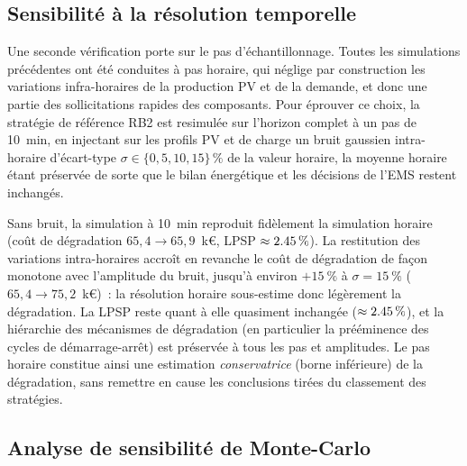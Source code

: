 \subsection{Sensibilité à la résolution temporelle}

Une seconde vérification porte sur le pas d'échantillonnage. Toutes les simulations précédentes ont été conduites à pas horaire, qui néglige par construction les variations infra-horaires de la production PV et de la demande, et donc une partie des sollicitations rapides des composants. Pour éprouver ce choix, la stratégie de référence RB2 est resimulée sur l'horizon complet à un pas de \SI{10}{\minute}, en injectant sur les profils PV et de charge un bruit gaussien intra-horaire d'écart-type $\sigma \in \{0,5,10,15\}\,\%$ de la valeur horaire, la moyenne horaire étant préservée de sorte que le bilan énergétique et les décisions de l'EMS restent inchangés.

Sans bruit, la simulation à \SI{10}{\minute} reproduit fidèlement la simulation horaire (coût de dégradation $65{,}4 \rightarrow 65{,}9$~k€, LPSP $\approx \SI{2{,}45}{\percent}$). La restitution des variations intra-horaires accroît en revanche le coût de dégradation de façon monotone avec l'amplitude du bruit, jusqu'à environ $+\SI{15}{\percent}$ à $\sigma = \SI{15}{\percent}$ ($65{,}4 \rightarrow 75{,}2$~k€)~: la résolution horaire sous-estime donc légèrement la dégradation. La LPSP reste quant à elle quasiment inchangée ($\approx \SI{2{,}45}{\percent}$), et la hiérarchie des mécanismes de dégradation (en particulier la prééminence des cycles de démarrage-arrêt) est préservée à tous les pas et amplitudes. Le pas horaire constitue ainsi une estimation \emph{conservatrice} (borne inférieure) de la dégradation, sans remettre en cause les conclusions tirées du classement des stratégies.

\subsection{Analyse de sensibilité de Monte-Carlo}

